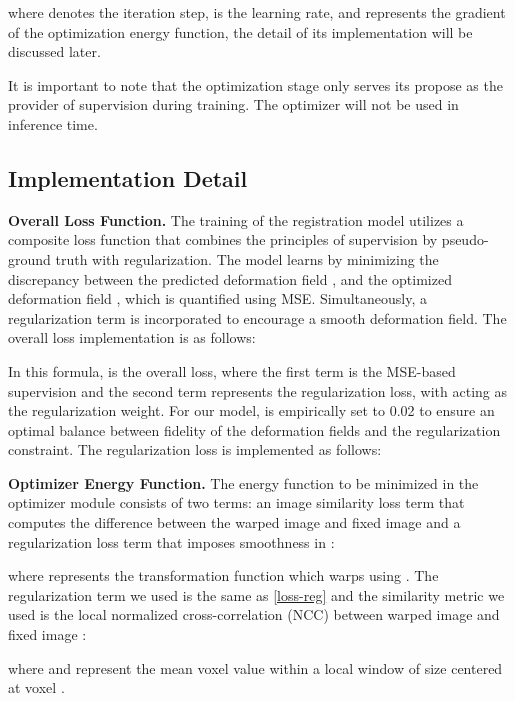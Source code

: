 \documentclass[10pt,twocolumn,letterpaper]{article}
\begin{document}
where  denotes the iteration step,  is the learning rate, and  represents the gradient of the optimization energy function, the detail of its implementation will be discussed later.

It is important to note that the optimization stage only serves its propose as the provider of supervision during training. The optimizer will not be used in inference time.







\subsection{Implementation Detail}

\textbf{Overall Loss Function.} The training of the registration model utilizes a composite loss function that combines the principles of supervision by pseudo-ground truth with regularization. The model learns by minimizing the discrepancy between the predicted deformation field , and the optimized deformation field , which is quantified using MSE. Simultaneously, a regularization term  is incorporated to encourage a smooth deformation field. The overall loss implementation is as follows:

In this formula,  is the overall loss, where the first term is the MSE-based supervision and the second term represents the regularization loss, with  acting as the regularization weight. For our model,  is empirically set to 0.02 to ensure an optimal balance between fidelity of the deformation fields and the regularization constraint. The regularization loss is implemented as follows:











\textbf{Optimizer Energy Function.} 
The energy function to be minimized in the optimizer module consists of two terms: an image similarity loss term that computes the difference between the warped image  and fixed image  and a regularization loss term that imposes smoothness in :

where  represents the transformation function which warps  using . The regularization term we used is the same as \cref{loss-reg} and the similarity metric we used is the local normalized cross-correlation (NCC) between warped image  and fixed image :

where  and  represent the mean voxel value within a local window of size  centered at voxel .
\end{document}
